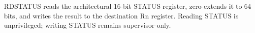 RDSTATUS reads the architectural 16-bit STATUS register, zero-extends it to 64 bits, and writes the result to the destination Rn register. Reading STATUS is unprivileged; writing STATUS remains supervisor-only.
